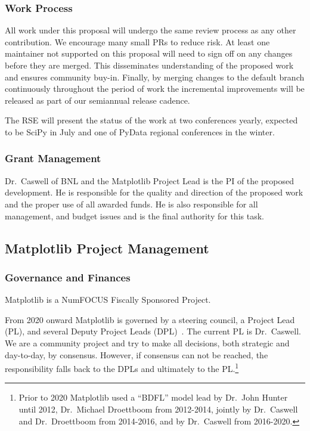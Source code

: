 \documentclass[12pt]{article}
\numberwithin{page}{section}
\begin{document}
\subsubsection{Work Process}

All work under this proposal will undergo the same review process
as any other contribution.  We
encourage many small PRs to reduce risk.  At least one maintainer not
supported on this proposal
will need to sign off on any changes before they are merged. This
disseminates understanding of the proposed work and ensures
community buy-in.  Finally, by merging
changes to the default branch continuously throughout the period of
work the incremental improvements will be released as part of our
semiannual release cadence.

The RSE will present the status of the work at two conferences yearly,
expected to be SciPy in July and one of PyData regional conferences in
the winter.


\subsubsection{Grant Management}

Dr.\ Caswell of BNL and the Matplotlib Project Lead is the PI of the proposed
development.  He is responsible for the quality and direction of the proposed
work and the proper use of all awarded funds.  He is also responsible for all
management, and budget issues and is the final authority for this task.


\subsection{Matplotlib Project Management}
\subsubsection{Governance and Finances}

Matplotlib is a NumFOCUS Fiscally Sponsored Project.

From 2020 onward Matplotlib is governed by a steering council, a Project Lead
(PL), and several Deputy Project Leads (DPL)~\cite{gov}.  The current PL is
Dr.\ Caswell.  We are a community project and try to make all decisions, both
strategic and day-to-day, by consensus.  However, if consensus can not be
reached, the responsibility falls back to the DPLs and ultimately to the
PL.\footnote{Prior to 2020 Matplotlib used a ``BDFL'' model lead by Dr.\ John
Hunter until 2012, Dr.\ Michael Droettboom from 2012-2014, jointly by
Dr.\ Caswell and Dr.\ Droettboom from 2014-2016, and by Dr.\ Caswell from
2016-2020.}
\end{document}
